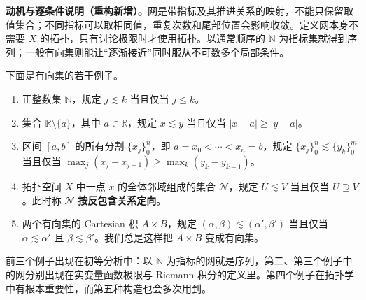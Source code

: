 \documentclass[../../main.tex]{subfiles}%
\begin{document}
\begin{remark}
\textbf{动机与逐条件说明（重构新增）。}网是带指标及其推进关系的映射，不能只保留取值集合；不同指标可以取相同值，重复次数和尾部位置会影响收敛。定义网本身不需要 $X$ 的拓扑，只有讨论极限时才使用拓扑。以通常顺序的 $\mathbb N$ 为指标集就得到序列；一般有向集则能让“逐渐接近”同时服从不可数多个局部条件。
\end{remark}
\begin{examples}\label{examples:ch04-directed-sets}
下面是有向集的若干例子。
\begin{enumerate}[label=(\roman*)]
\item\label{item:ch04-directed-integers} 正整数集 $\mathbb N$，规定 $j\lesssim k$ 当且仅当 $j\le k$。
\item\label{item:ch04-directed-punctured-line} 集合 $\mathbb R\setminus\{a\}$，其中 $a\in\mathbb R$，规定 $x\lesssim y$ 当且仅当 $|x-a|\ge|y-a|$。
\item\label{item:ch04-directed-partitions} 区间 $[a,b]$ 的所有分割 $\{x_j\}_0^n$，即 $a=x_0<\cdots<x_n=b$，规定 $\{x_j\}_0^n\lesssim\{y_k\}_0^m$ 当且仅当 $\max_j(x_j-x_{j-1})\ge\max_k(y_k-y_{k-1})$。
\item\label{item:ch04-directed-neighborhoods} 拓扑空间 $X$ 中一点 $x$ 的全体邻域组成的集合 $\mathcal N$，规定 $U\lesssim V$ 当且仅当 $U\supseteq V$。此时称 $\mathcal N$ \textbf{按反包含关系定向}。
\item\label{item:ch04-directed-product} 两个有向集的 Cartesian 积 $A\times B$，规定 $(\alpha,\beta)\lesssim(\alpha',\beta')$ 当且仅当 $\alpha\lesssim\alpha'$ 且 $\beta\lesssim\beta'$。我们总是这样把 $A\times B$ 变成有向集。
\end{enumerate}
\end{examples}
前三个例子出现在初等分析中：以 $\mathbb N$ 为指标的网就是序列，第二、第三个例子中的网分别出现在实变量函数极限与 Riemann 积分的定义里。第四个例子在拓扑学中有根本重要性，而第五种构造也会多次用到。
\end{document}
